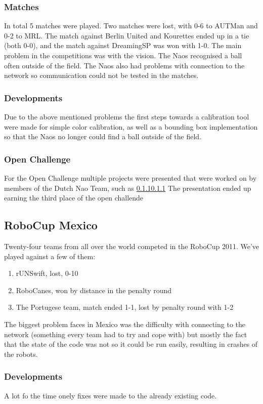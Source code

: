 \documentclass[11pt,a4paper,oneside]{article}
\begin{document}
\subsubsection{Matches}
In total 5 matches were played. Two matches were lost, with 0-6 to AUTMan and 0-2 to MRL. The match against Berlin United and Kourettes ended up in a tie (both 0-0), and the match against DreamingSP was won with 1-0.
The main problem in the competitions was with the vision. The Naos recognised a ball often outside of the field. The Naos also had problems with connection to the network so communication could not be tested in the matches.

\subsubsection{Developments}
Due to the above mentioned problems the first steps towards a calibration tool were made for simple color calibration, as well as a bounding box implementation so that the Naos no longer could find a ball outside of the field.

\subsubsection{Open Challenge}

For the Open Challenge multiple projects were presented that were worked on by members of the Dutch Nao Team, such as \ref{}\ref{}
The presentation ended up earning the third place of the open challende

\subsection{RoboCup Mexico}

Twenty-four teams from all over the world competed in the RoboCup 2011. We've played against a few of them:
\begin{enumerate}
\item rUNSwift, lost, 0-10
\item RoboCanes, won by distance in the penalty round
\item The Portugese team, match ended 1-1, lost by penalty round with 1-2
\end{enumerate}
The biggest problem faces in Mexico was the difficulty with connecting to the network (something every team had to try and cope with) but mostly the fact that the state of the code was not so it could be run easily, resulting in crashes of the robots.
\subsubsection{Developments}
A lot fo the time onely fixes were made to the already existing code.
\end{document}
